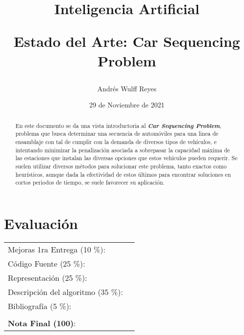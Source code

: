 \documentclass[letter, 10pt]{article}
\begin{document}
\title{Inteligencia Artificial \\ \begin{Large}Estado del Arte: Car Sequencing Problem\end{Large}}
\author{Andrés Wulff Reyes}
\date{29 de Noviembre de 2021}
\maketitle


\section*{Evaluaci\'on}

\begin{tabular}{ll}
Mejoras 1ra Entrega (10 \%): &  \underline{\hspace{2cm}}\\
C\'odigo Fuente (25 \%): &  \underline{\hspace{2cm}}\\
Representaci\'on (25 \%):  & \underline{\hspace{2cm}} \\
Descripci\'on del algoritmo (35 \%):  & \underline{\hspace{2cm}} \\
Bibliograf\'ia (5 \%): & \underline{\hspace{2cm}}\\
 &  \\
\textbf{Nota Final (100)}:   & \underline{\hspace{2cm}}
\end{tabular}

\begin{abstract}
En este documento se da una vista introductoria al \textit{\textbf{Car Sequencing Problem}}, problema que busca determinar una secuencia de automóviles para una linea de ensamblaje con tal de cumplir con la demanda de diversos tipos de vehículos, e intentando minimizar la penalización asociada a sobrepasar la capacidad máxima de las estaciones que instalan las diversas opciones que estos vehículos pueden requerir. Se suelen utilizar diversos m\'etodos para solucionar este problema, tanto exactos como heurísticos, aunque dada la efectividad de estos últimos para encontrar soluciones en cortos periodos de tiempo, se suele favorecer su aplicación.
\end{abstract}
\end{document}
